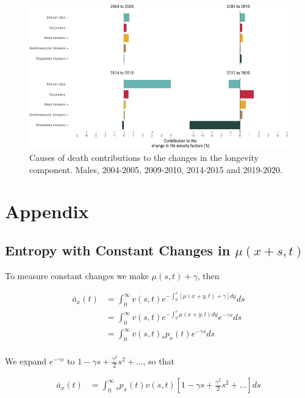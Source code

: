 \documentclass[12pt]{article}
\begin{document}
\begin{figure}[!ht]
	\centering
	\includegraphics[width=1\linewidth]{Fig/attributionCauseOfDeath}
	\caption{{Causes of death contributions to the changes in the longevity component. Males, 2004-2005, 2009-2010, 2014-2015 and 2019-2020.}}
	\label{fig:Fig7}
\end{figure}


\FloatBarrier
\newpage
\appendix
\section{Appendix}

\subsection{Entropy with Constant Changes in $\mu(x+s,t)$}\label{sec:EntropyConst}

To measure constant changes we make $\mu(s,t)+\gamma$, then

\begin{equation}\label{eq:EntropyConst1}
\begin{split}
\bar{a}_{x}(t) &= \int_0^\infty{v}(s,t) e^{-\int_{0}^{s} [\mu(x+y,t)+\gamma]dy}ds \\
&= \int_0^\infty {v}(s,t)e^{-\int_{0}^{s} \mu(x+y,t)dy} e^{-\gamma s}ds \\
&= \int_0^\infty {v}(s,t){}_sp_x(t) e^{-\gamma s}ds \\
\end{split}
\end{equation}

We expand $e^{-\gamma s}$ to $1-\gamma s+\frac{\gamma^2}{2} s^{2} +...$, so that


\begin{equation}\label{eq:EntropyConst2}
\begin{split}
\bar{a}_{x}(t) &= \int_0^\infty {}_sp_x(t) {v}(s,t)[1-\gamma s+\frac{\gamma^2}{2} s^{2} +...]ds
\end{split}
\end{equation}
\end{document}
